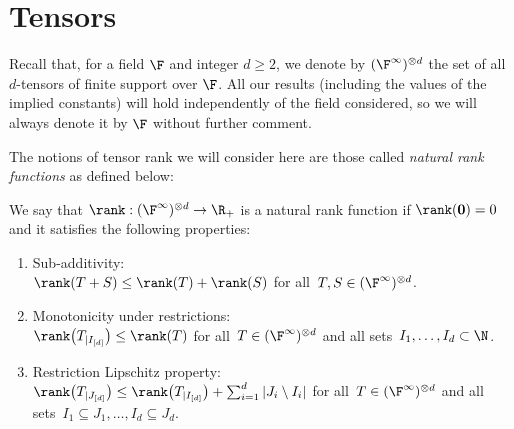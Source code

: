 \section{Tensors}
\label{sec:tensors}

Recall that, for a field $\F$ and integer $d\geq 2$, we denote by $(\F^\infty)^{\otimes d}$ the set of all $d$-tensors of finite support over $\F$.
All our results (including the values of the implied constants) will hold independently of the field considered, so we will always denote it by $\F$ without further comment.

The notions of tensor rank we will consider here are those called \emph{natural rank functions} as defined below:

\begin{definition}\label{def:nat_rank}
We say that $\rank: (\F^{\infty})^{\otimes d} \to \R_+$ is a natural rank function if $\rank({\bf 0}) = 0$ and it satisfies the following properties:
\begin{enumerate}
    \item Sub-additivity: \\
    $\rank(T+S) \leq \rank(T) + \rank(S)$ for all~$T, S\in (\F^{\infty})^{\otimes d}$.
    \item Monotonicity under restrictions: \\
    $\rank\big(T_{|I_{[d]}}\big) \leq \rank(T)$ for all~$T\in (\F^{\infty})^{\otimes d}$ and all sets~$I_1, \dots, I_d \subset \N$.
    \item Restriction Lipschitz property: \\
    $\rank\big(T_{|J_{[d]}}\big) \leq \rank\big(T_{|I_{[d]}}\big) + \sum_{i=1}^d |J_i \setminus I_i|$
    for all~$T\in (\F^{\infty})^{\otimes d}$ and all sets~$I_1\subseteq J_1, \dots, I_d\subseteq J_d$.
    \end{enumerate}
\end{definition}
